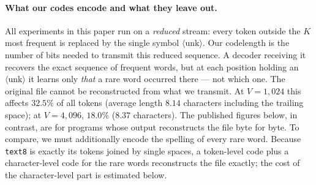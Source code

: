 \documentclass[11pt]{article}
\begin{document}
\paragraph{What our codes encode and what they leave out.}
All experiments in this paper run on a \emph{reduced} stream: every
token outside the $K$ most frequent is replaced by the single symbol
$\langle\mathrm{unk}\rangle$.  Our codelength is the number of bits
needed to transmit this reduced sequence.  A decoder receiving it
recovers the exact sequence of frequent words, but at each position
holding an $\langle\mathrm{unk}\rangle$ it learns only \emph{that} a
rare word occurred there --- not which one.  The original file cannot
be reconstructed from what we transmit.  At $V=1{,}024$ this affects
$32.5\%$ of all tokens (average length $8.14$ characters including
the trailing space); at $V=4{,}096$, $18.0\%$ ($8.37$ characters).
The published figures below, in contrast, are for programs whose
output reconstructs the file byte for byte.  To compare, we must
additionally encode the spelling of every rare word.  Because
\texttt{text8} is exactly its tokens joined by single spaces, a
token-level code plus a character-level code for the rare words
reconstructs the file exactly; the cost of the character-level part
is estimated below.
\end{document}
